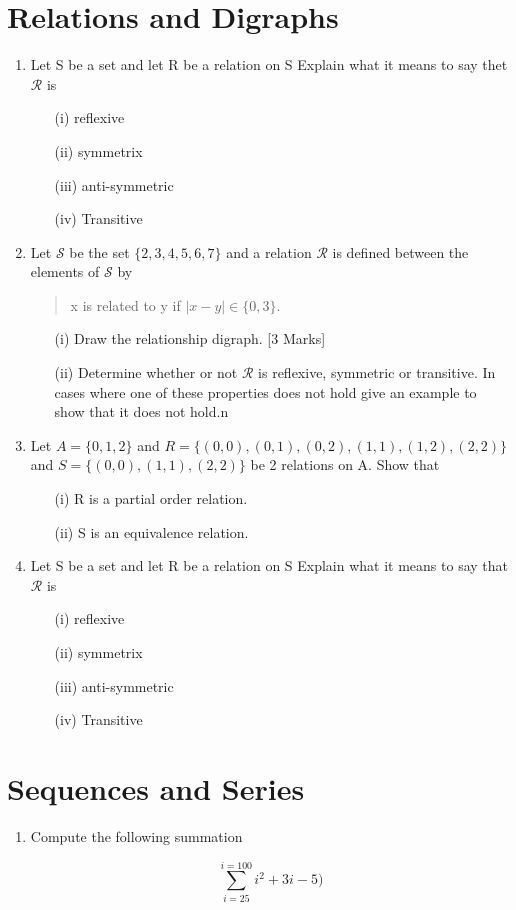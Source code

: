 \documentclass[]{article}
\begin{document}
\section*{Relations and Digraphs}
\begin{enumerate}
\item 
Let S be a set and let R be a relation on S
Explain what it means to say thet $\mathcal{R}$ is

\begin{itemize}
\item[(i)] reflexive
\item[(ii)] symmetrix
\item[(iii)] anti-symmetric
\item[(iv)] Transitive
\end{itemize}



\item  Let $\mathcal{S}$ be the set $\{2,3,4,5,6,7\}$ and a relation $\mathcal{R}$ is defined between the elements of $\mathcal{S}$ by
    \begin{center}
\begin{quote}
x is related to y if $|x - y| \in \{0,3\}$.
\end{quote}
\end{center}
\begin{itemize}
\item[(i)] Draw the relationship digraph. [3 Marks]
\item[(ii)] Determine whether or not $\mathcal{R}$ is reflexive, symmetric or transitive. In cases
where one of these properties does not hold give an example to show that
it does not hold.n 
\end{itemize}


\item Let $A=\{0,1,2\}$ and $R=\{ (0,0),(0,1),(0,2),(1,1), (1,2), (2,2)\}$
and $S=\{(0,0),(1,1),(2,2)\}$ be 2 relations on A. Show that

\begin{itemize}
\item[(i)] R is a partial order relation.
\item[(ii)] S is an equivalence relation.
\end{itemize}

\item 
Let S be a set and let R be a relation on S
Explain what it means to say that $\mathcal{R}$ is

\begin{itemize}
	\item[(i)] reflexive
	\item[(ii)] symmetrix
	\item[(iii)] anti-symmetric
	\item[(iv)] Transitive
\end{itemize}

\end{enumerate}
\section*{Sequences and Series}

\begin{enumerate}
\item Compute the following summation

\[ \sum^{i=100}_{i=25} i^2 + 3i -5)\]

\end{enumerate}
\end{document}
